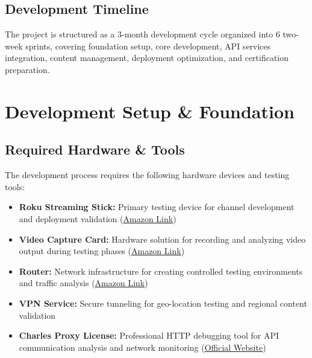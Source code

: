 \documentclass[11pt,letterpaper]{article}
\begin{document}
\subsection{Development Timeline}
The project is structured as a 3-month development cycle organized into 6 two-week sprints, covering foundation setup, core development, API services integration, content management, deployment optimization, and certification preparation.

\section{Development Setup \& Foundation}
\label{sec:development-setup}


\subsection{Required Hardware \& Tools}
The development process requires the following hardware devices and testing tools:
\begin{itemize}
    \item \textbf{Roku Streaming Stick:} Primary testing device for channel development and deployment validation (\href{https://www.amazon.com/Streaming-Dispositivo-control-controles-renovado/dp/B09X5DL9S5/ref=sr_1_1_sspa?__mk_es_US=%C3%85M%C3%85%C5%BD%C3%95%C3%91&crid=2R6U7LCGCRPQ4&dib=eyJ2IjoiMSJ9.TRH5bXnlx5501YwqrZmVIKt0hBIQuSG06EBYNqqx8spkF4HWtu8iLFT_-GwS2ecf3xCTIrKzixktw_WPmrXixzb5Nv4Tar-vDfAd1h2fvTjxUZluOryzGO6cVkAofQZj0Y4nQEhfYSdqHzOEdDEiUZg8_iXGDYdNOotMoNv_lRCQop_ZL9KmuHOfXnIFA87np1Dh0I3TH3sC9Cq_bCOVuxvWtpy_NR3JY3sME42NybQ.MXFqmDZbn7GOjml9UDvE2hlKBNLy-vj5rB74LK7I7jk&dib_tag=se&keywords=roku+streaming+stick+4K&qid=1759005773&sprefix=roku+streaming+stick+%2Caps%2C842&sr=8-1-spons&sp_csd=d2lkZ2V0TmFtZT1zcF9hdGY&psc=1}{Amazon Link})
    \item \textbf{Video Capture Card:} Hardware solution for recording and analyzing video output during testing phases (\href{https://www.amazon.com/-/es/gp/product/B08QJ84JNP/ref=ewc_pr_img_1?smid=A3IK7HWRZCAKOB&th=1}{Amazon Link})
    \item \textbf{Router:} Network infrastructure for creating controlled testing environments and traffic analysis (\href{https://www.amazon.com/-/es/GL-iNet-GL-MT300N-V2-bolsillo-inal%C3%A1mbrico-port%C3%A1til/dp/B073TSK26W/ref=sr_1_1?dib=eyJ2IjoiMSJ9.hs1OPJDykvs6nbvLopN23SPzCT-a44RdsttmR8laU4JsAlNPn0uUU3A051Lk8gOAaLLVTF1eudr67loelt9DI_GCWZNjOJBop3JGmonB4vBRqfWC0OZHj9yq2KKAHU0fjqF9l1OjQFPQ-bQkZGtnVFgcdh2Rj4Csq7lA-4Fj_72reVCb8NxXP7bKwolWlbhRfwT7ihxxaol2xX2qQt4isxrp6vAsZquXzMfXkzO-N-V7s3AnRcLxZf2NcA7EwCrlHsfG3EQgMUJp57QGbbcQP-GLa6HmnLc4f3-ibiSG5ds.lwp8NSJElSCtUnQ_ko5R44N7FN3UtYSiIRIR85hJkaA&dib_tag=se&keywords=Mango+Router&qid=1759005839&sr=8-1}{Amazon Link})
    \item \textbf{VPN Service:} Secure tunneling for geo-location testing and regional content validation
    \item \textbf{Charles Proxy License:} Professional HTTP debugging tool for API communication analysis and network monitoring (\href{https://www.charlesproxy.com/}{Official Website})
\end{itemize}
\end{document}
